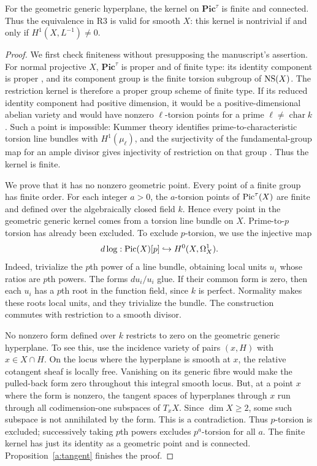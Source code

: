 \begin{proposition}\label{a:generic}
For the geometric generic hyperplane, the kernel on $\mathbf{Pic}^\tau$
is finite and connected.  Thus the equivalence in R3 is valid for smooth
$X$: this kernel is nontrivial if and only if $H^1(X,L^{-1})\ne0$.
\end{proposition}
\begin{proof}
We first check finiteness without presupposing the manuscript's assertion.
For normal projective $X$, $\mathbf{Pic}^\tau$ is proper and of finite
type: its identity component is proper
\cite[Theorem 5.4 and Remark 5.6]{Kleiman2005}, and its component group
is the finite torsion subgroup of $\operatorname{NS}(X)$.  The restriction kernel is
therefore a proper group scheme of finite type.  If its reduced identity
component had positive dimension, it would be a positive-dimensional
abelian variety and would have nonzero $\ell$-torsion points for a prime
$\ell\ne\operatorname{char}k$.  Such a point is impossible: Kummer
theory identifies prime-to-characteristic torsion line bundles with
$H^1(\mu_\ell)$, and the surjectivity of the fundamental-group map for
an ample divisor gives injectivity of restriction on that group
\cite[Expos\'e XII, Corollary 3.5]{SGA2}.  Thus the kernel is finite.

We prove that it has no nonzero geometric point.  Every point of a finite
group has finite order.  For each integer $a>0$, the $a$-torsion points
of $\operatorname{Pic}^\tau(X)$ are finite and defined over the algebraically closed
field $k$.  Hence every point in the geometric generic kernel comes from
a torsion line bundle on $X$.  Prime-to-$p$ torsion has already been
excluded.  To exclude $p$-torsion, we use the injective map
\[
 d\log:\operatorname{Pic}(X)[p]\hookrightarrow H^0(X,\Omega_X^1).
\]
Indeed, trivialize the $p$th power of a line bundle, obtaining local
units $u_i$ whose ratios are $p$th powers.  The forms $du_i/u_i$ glue.
If their common form is zero, then each $u_i$ has a $p$th root in the
function field, since $k$ is perfect.  Normality makes these roots local
units, and they trivialize the bundle.  The construction commutes with
restriction to a smooth divisor.

No nonzero form defined over $k$ restricts to zero on the geometric generic
hyperplane.  To see this, use the incidence variety of pairs $(x,H)$ with
$x\in X\cap H$.  On the locus where the hyperplane is smooth at $x$,
the relative cotangent sheaf is locally free.  Vanishing on its generic
fibre would make the pulled-back form zero throughout this integral
smooth locus.  But, at a point $x$ where the form is nonzero, the tangent
spaces of hyperplanes through $x$ run through all codimension-one
subspaces of $T_xX$.  Since $\dim X\geq2$, some such subspace is not
annihilated by the form.  This is a contradiction.  Thus $p$-torsion is
excluded; successively taking $p$th powers excludes $p^a$-torsion for
all $a$.  The finite kernel has just its identity as a geometric point
and is connected.  Proposition~\ref{a:tangent} finishes the proof.
\end{proof}

